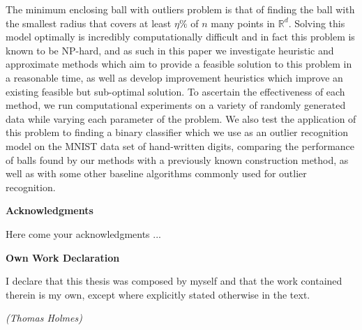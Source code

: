 \documentclass[11pt,twoside]{report}
\theoremstyle{definition}
\numberwithin{theorem}{section}
\numberwithin{definition}{section}
\numberwithin{lemma}{section}
\numberwithin{proposition}{section}
\numberwithin{equation}{section}
\numberwithin{figure}{section}
\begin{document}
The minimum enclosing ball with outliers problem is that of finding the ball with the smallest radius that covers at least $\eta\%$ of $n$ many points in $\mathbb{R}^d$. Solving this model optimally is incredibly computationally difficult and in fact this problem is known to be NP-hard, and as such in this paper we investigate heuristic and approximate methods which aim to provide a feasible solution to this problem in a reasonable time, as well as develop improvement heuristics which improve an existing feasible but sub-optimal solution. To ascertain the effectiveness of each method, we run computational experiments on a variety of randomly generated data while varying each parameter of the problem. We also test the application of this problem to finding a binary classifier which we use as an outlier recognition model on the MNIST data set of hand-written digits, comparing the performance of balls found by our methods with a previously known construction method, as well as with some other baseline algorithms commonly used for outlier recognition.

\clearpage
\vspace*{10mm}
\begin{center}
\textbf{\huge{Acknowledgments}}
\end{center}
\vspace*{20mm}

Here come your acknowledgments ...

\clearpage

\vspace*{10mm}
\begin{center}
\textbf{\huge{Own Work Declaration}}
\end{center}
\vspace*{20mm}

\noindent I declare that this thesis was composed by myself and that the work contained therein is my own, except where explicitly stated otherwise in the text.

\vspace*{10mm}

\begin{flushright}
\textit{(Thomas Holmes)}
\end{flushright}

\cleardoublepage



\pagestyle{plain}
\setcounter{page}{1}
\end{document}
